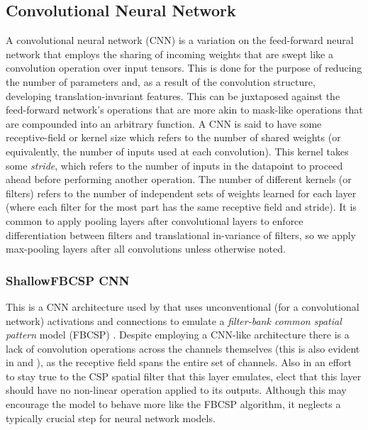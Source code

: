 \documentclass[utf8]{frontiersSCNS} %
\begin{document}
\subsection{Convolutional Neural Network}


A convolutional neural network (CNN) \cite{LecunnMNIST, GoodfellowTextbook} is a variation on the feed-forward neural network that employs the sharing of incoming weights that are swept like a convolution operation over input tensors. This is done for the purpose of reducing the number of parameters and, as a result of the convolution structure, developing translation-invariant features. This can be juxtaposed against the feed-forward network's operations that are more akin to mask-like operations that are compounded into an arbitrary function. A CNN is said to have some receptive-field or kernel size which refers to the number of shared weights (or equivalently, the number of inputs used at each convolution). This kernel takes some {\em stride}, which refers to the number of inputs in the datapoint to proceed ahead before performing another operation. The number of different kernels (or filters) refers to the number of independent sets of weights learned for each layer (where each filter for the most part has the same receptive field and stride). It is common to apply pooling layers \cite{} after convolutional layers to enforce differentiation between filters and translational in-variance of filters, so we apply max-pooling \cite{} layers after all convolutions unless otherwise noted.

\subsubsection{ShallowFBCSP CNN}

This is a CNN architecture used by \cite{Schirrmeister2017} that uses unconventional (for a convolutional network) activations and connections to emulate a \emph{filter-bank common spatial pattern} model (FBCSP) \cite{KaiKengAng2008}. Despite employing a CNN-like architecture there is a lack of convolution operations across the channels themselves (this is also evident in \cite{Lawhern2017} and \cite{Sun}), as the receptive field spans the entire set of channels. Also in an effort to stay true to the CSP spatial filter that this layer emulates, \cite{Schirrmeister2017} elect that this layer should have no non-linear operation applied to its outputs. Although this may encourage the model to behave more like the FBCSP algorithm, it neglects a typically crucial step for neural network models.
\end{document}
